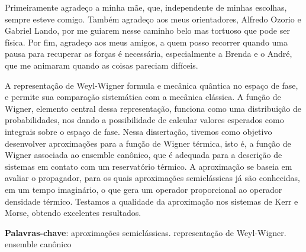 \documentclass[
	12pt,
	oneside,			%
	a4paper,			%
	english,			%
	brazil				%
	]{abntex2}
\theoremstyle{definition}
\begin{document}
\frenchspacing 

\imprimircapa

\imprimirfolhaderosto

\begin{agradecimentos}

Primeiramente agradeço a minha mãe, que, independente de minhas escolhas, sempre esteve comigo. Também agradeço aos meus orientadores, Alfredo Ozorio e Gabriel Lando, por me guiarem nesse caminho belo mas tortuoso que pode ser  física. Por fim, agradeço aos meus amigos, a quem posso recorrer quando uma pausa para recuperar as forças é necessária, especialmente a Brenda e o André, que me animaram quando as coisas pareciam difíceis. 

\end{agradecimentos}

\setlength{\absparsep}{18pt}
\begin{resumo}

A representação de Weyl-Wigner formula e mecânica quântica no espaço de fase, e permite sua comparação sistemática com a mecânica clássica. A função de Wigner, elemento central dessa representação, funciona como uma distribuição de probabilidades, nos dando a possibilidade de calcular valores esperados como integrais sobre o espaço de fase. Nessa dissertação, tivemos como objetivo desenvolver aproximações para a função de Wigner térmica, isto é, a função de Wigner associada ao ensemble canônico, que é adequada para a descrição de sistemas em contato com um reservatório térmico. A aproximação se baseia em avaliar o propagador, para os quais aproximações semiclássicas já são conhecidas, em um tempo imaginário, o que gera um operador proporcional ao operador densidade térmico. Testamos a qualidade da aproximação nos sistemas de Kerr e Morse, obtendo excelentes resultados.

\vspace{\onelineskip}
\noindent 
 \textbf{Palavras-chave}: aproximações semiclássicas. representação de Weyl-Wigner. ensemble canônico
\end{resumo}
\end{document}
